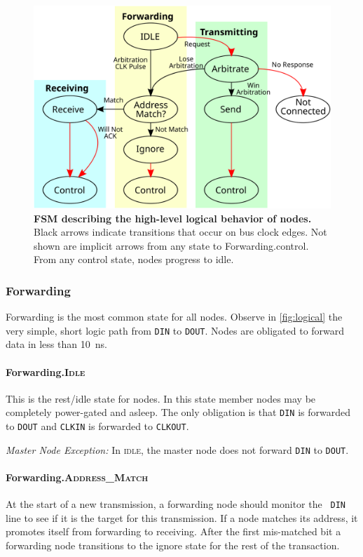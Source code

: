 \begin{figure}[h]
  \includegraphics[width=\linewidth]{img/fsm_diagram}
  \caption{\textbf{FSM describing the high-level logical behavior of \bus
    nodes.} \textmd{
    Black arrows indicate transitions that occur on bus clock edges. Not shown
    are implicit arrows from any state to Forwarding.{\sc control}. From any
    {\sc control} state, nodes progress to {\sc idle}.
    }}
\end{figure}

\subsubsection{Forwarding}
Forwarding is the most common state for all \bus nodes. Observe in
\autoref{fig:logical} the very simple, short logic path from {\tt DIN} to
{\tt DOUT}. Nodes are obligated to forward data in less than 10~ns.

\paragraph{Forwarding.\textsc{Idle}}
This is the rest/idle state for \bus nodes. In this state member nodes may be
completely power-gated and asleep. The only obligation is that {\tt DIN} is
forwarded to {\tt DOUT} and {\tt CLKIN} is forwarded to {\tt CLKOUT}.

\medskip
\noindent
{\em Master Node Exception:} In \textsc{idle}, the master node does not
forward {\tt DIN} to {\tt DOUT}.

\paragraph{Forwarding.\textsc{Address\_Match}}
At the start of a new transmission, a forwarding node should monitor the {\tt
DIN} line to see if it is the target for this transmission. If a node matches
its address, it promotes itself from forwarding to receiving. After the first
mis-matched bit a forwarding node transitions to the {\sc ignore} state for
the rest of the transaction.

